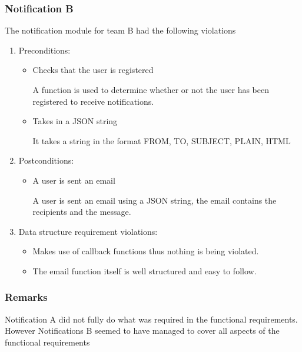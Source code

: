 \subsubsection*{Notification B}
 The notification module for team B had the following violations
 \begin{enumerate}
 	\item Preconditions:
 	\begin{itemize}
 		
			\item Checks that the user is registered 
			
			A function is used to determine whether or not the user has been registered to receive notifications.
			
			\item Takes in a JSON string
				
			It takes a string in the format FROM, TO, SUBJECT, PLAIN, HTML
 		
 		 
 	\end{itemize}
	\item Postconditions:
	\begin{itemize}
			\item A user is sent an email
			
			A user is sent an email using a JSON string, the email contains the recipients and the message.
 	
	\end{itemize}
	\item Data structure requirement violations:
 	\begin{itemize}
 		\item 	Makes use of callback functions thus nothing is being violated.
		\item	The email function itself is well structured and easy to follow.
 	\end{itemize}
 \end{enumerate}
 \subsubsection*{Remarks}
 Notification A did not fully do what was required in the functional requirements. However Notifications B seemed to have managed to cover all aspects of the functional requirements